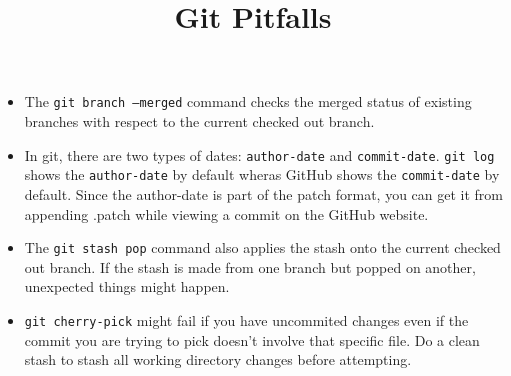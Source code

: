 \documentclass{../template/texnote}
\title{Git Pitfalls}
\begin{document}
    \maketitle {}

	\begin{itemize}
		\item The \texttt{git branch --merged} command checks the merged status of existing branches with respect to the current checked out branch.
		\item In git, there are two types of dates: \texttt{author-date} and \texttt{commit-date}. \texttt{git log} shows the \texttt{author-date} by default wheras GitHub shows the \texttt{commit-date} by default. Since the author-date is part of the patch format, you can get it from appending .patch while viewing a commit on the GitHub website.
		\item The \texttt{git stash pop} command also applies the stash onto the current checked out branch. If the stash is made from one branch but popped on another, unexpected things might happen.
		\item \texttt{git cherry-pick} might fail if you have uncommited changes even if the commit you are trying to pick doesn't involve that specific file. Do a clean stash to stash all working directory changes before attempting.
	\end{itemize}
    \printbibliography
\end{document}

